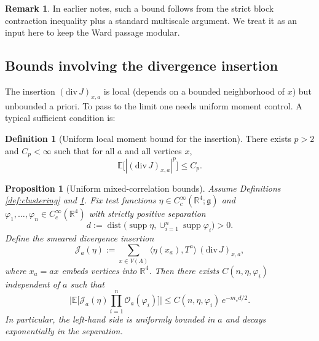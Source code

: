 \documentclass[11pt]{article}
\newtheorem{proposition}[theorem]{Proposition}
\theoremstyle{definition}
\newtheorem{definition}[theorem]{Definition}
\newtheorem{remark}[theorem]{Remark}
\newcommand{\E}{\mathbb{E}}
\newcommand{\1}{\mathbf{1}}
\newcommand{\dist}{\operatorname{dist}}
\newcommand{\supp}{\operatorname{supp}}
\newcommand{\g}{\mathfrak{g}}
\begin{document}
\begin{remark}
In earlier notes, such a bound follows from the strict block contraction inequality plus a standard multiscale argument.
We treat it as an input here to keep the Ward passage modular.
\end{remark}

\subsection{Bounds involving the divergence insertion}
The insertion $(\mathrm{div}\,J)_{x,a}$ is local (depends on a bounded neighborhood of $x$) but unbounded a priori.
To pass to the limit one needs uniform moment control. A typical sufficient condition is:

\begin{definition}[Uniform local moment bound for the insertion]\label{def:moment}
There exists $p>2$ and $C_p<\infty$ such that for all $a$ and all vertices $x$,
\begin{equation}\label{eq:moment}
  \E\big[ |(\mathrm{div}\,J)_{x,a}|^p \big] \le C_p.
\end{equation}
\end{definition}

\begin{proposition}[Uniform mixed-correlation bounds]\label{prop:mixed-bounds}
Assume Definitions \ref{def:clustering} and \ref{def:moment}.
Fix test functions $\eta\in C_c^\infty(\mathbb{R}^4;\g)$ and $\varphi_1,\dots,\varphi_n\in C_c^\infty(\mathbb{R}^4)$ with strictly positive separation
\begin{equation*}
  d:=\dist\big(\supp\eta,\cup_{i=1}^n \supp\varphi_i\big)>0.
\end{equation*}
Define the smeared divergence insertion
\begin{equation}\label{eq:Jeta}
  \mathcal{J}_a(\eta):=\sum_{x\in V(\Lambda)} \langle \eta(x_a), T^a\rangle\,(\mathrm{div}\,J)_{x,a},
\end{equation}
where $x_a=ax$ embeds vertices into $\mathbb{R}^4$.
Then there exists $C(n,\eta,\varphi_i)$ independent of $a$ such that
\begin{equation}\label{eq:mixed-bound}
  \Big|\E\Big[\mathcal{J}_a(\eta)\prod_{i=1}^n \mathcal{O}_a(\varphi_i)\Big]\Big| \le C(n,\eta,\varphi_i)\,e^{-m_\star d/2}.
\end{equation}
In particular, the left-hand side is uniformly bounded in $a$ and decays exponentially in the separation.
\end{proposition}
\end{document}
